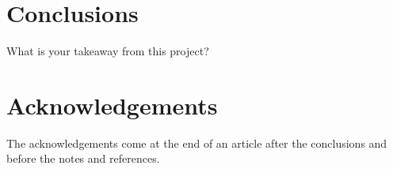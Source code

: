 \documentclass[twoside,twocolumn,9pt]{article}
\begin{document}
\section{Conclusions}
What is your takeaway from this project?


\section{Acknowledgements}

The acknowledgements come at the end of an article after the conclusions and before the notes and references. 






\end{document}
